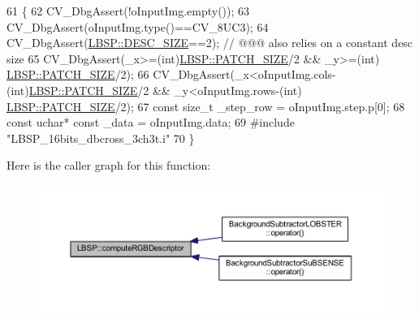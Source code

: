 \begin{DoxyCode}
61                                                                                                            
                                                           \{
62         CV\_DbgAssert(!oInputImg.empty());
63         CV\_DbgAssert(oInputImg.type()==CV\_8UC3);
64         CV\_DbgAssert(\mbox{\hyperlink{class_l_b_s_p_a11167130ddc713921e5bbb0b628d5f74}{LBSP::DESC\_SIZE}}==2); \textcolor{comment}{// @@@ also relies on a constant desc size}
65         CV\_DbgAssert(\_x>=(\textcolor{keywordtype}{int})\mbox{\hyperlink{class_l_b_s_p_aa98abb79a155d3a2b416c2ab32e74929}{LBSP::PATCH\_SIZE}}/2 && \_y>=(\textcolor{keywordtype}{int})
      \mbox{\hyperlink{class_l_b_s_p_aa98abb79a155d3a2b416c2ab32e74929}{LBSP::PATCH\_SIZE}}/2);
66         CV\_DbgAssert(\_x<oInputImg.cols-(\textcolor{keywordtype}{int})\mbox{\hyperlink{class_l_b_s_p_aa98abb79a155d3a2b416c2ab32e74929}{LBSP::PATCH\_SIZE}}/2 && \_y<oInputImg.rows-(\textcolor{keywordtype}{int})
      \mbox{\hyperlink{class_l_b_s_p_aa98abb79a155d3a2b416c2ab32e74929}{LBSP::PATCH\_SIZE}}/2);
67         \textcolor{keyword}{const} \textcolor{keywordtype}{size\_t} \_step\_row = oInputImg.step.p[0];
68         \textcolor{keyword}{const} uchar* \textcolor{keyword}{const} \_data = oInputImg.data;
69 \textcolor{preprocessor}{        #include "LBSP\_16bits\_dbcross\_3ch3t.i"}
70     \}
\end{DoxyCode}
Here is the caller graph for this function\+:\nopagebreak
\begin{figure}[H]
\begin{center}
\leavevmode
\includegraphics[width=350pt]{class_l_b_s_p_a27a44cb6f6e3015ee26047bd3d84f892_icgraph}
\end{center}
\end{figure}
\mbox{\label{class_l_b_s_p_a806e1de0fdf2a59acb9fa1303b62b102}} 
